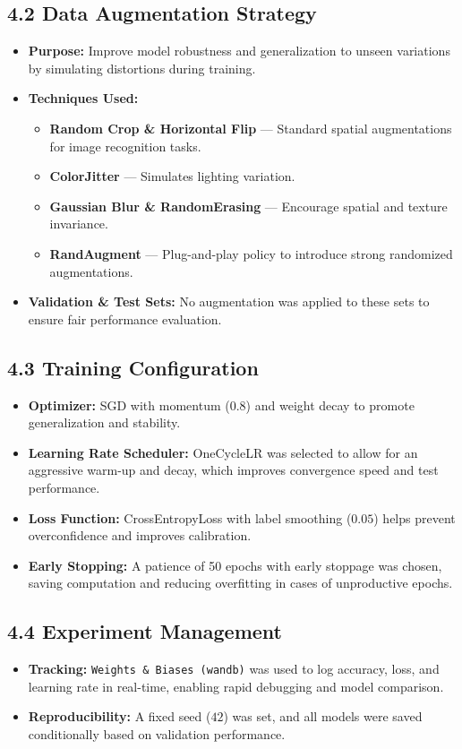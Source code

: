\documentclass{article}
\begin{document}
\subsection*{4.2 Data Augmentation Strategy}
\begin{itemize}
    \item \textbf{Purpose:} Improve model robustness and generalization to unseen variations by simulating distortions during training.
    \item \textbf{Techniques Used:}
    \begin{itemize}
        \item \textbf{Random Crop \& Horizontal Flip} — Standard spatial augmentations for image recognition tasks.
        \item \textbf{ColorJitter} — Simulates lighting variation.
        \item \textbf{Gaussian Blur \& RandomErasing} — Encourage spatial and texture invariance.
        \item \textbf{RandAugment} — Plug-and-play policy to introduce strong randomized augmentations.
    \end{itemize}
    \item \textbf{Validation \& Test Sets:} No augmentation was applied to these sets to ensure fair performance evaluation.
\end{itemize}

\subsection*{4.3 Training Configuration}
\begin{itemize}
    \item \textbf{Optimizer:} SGD with momentum ($0.8$) and weight decay to promote generalization and stability.
    \item \textbf{Learning Rate Scheduler:} OneCycleLR was selected to allow for an aggressive warm-up and decay, which improves convergence speed and test performance.
    \item \textbf{Loss Function:} CrossEntropyLoss with label smoothing ($0.05$) helps prevent overconfidence and improves calibration.
    \item \textbf{Early Stopping:} A patience of 50 epochs with early stoppage was chosen, saving computation and reducing overfitting in cases of unproductive epochs.
\end{itemize}

\subsection*{4.4 Experiment Management}
\begin{itemize}
    \item \textbf{Tracking:} \texttt{Weights \& Biases (wandb)} was used to log accuracy, loss, and learning rate in real-time, enabling rapid debugging and model comparison.
    \item \textbf{Reproducibility:} A fixed seed ($42$) was set, and all models were saved conditionally based on validation performance.
\end{itemize}
\end{document}
